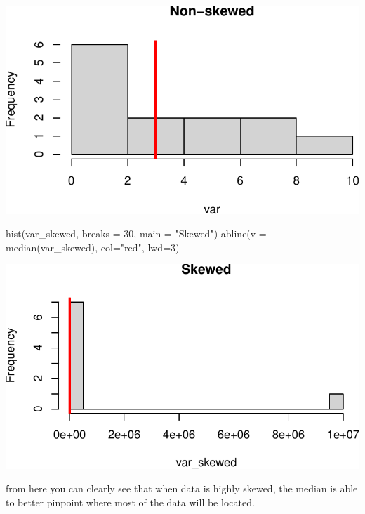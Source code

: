 \documentclass[
  letterpaper,
  DIV=11,
  numbers=noendperiod]{scrartcl}
\newenvironment{Shaded}{\begin{snugshade}}{\end{snugshade}}
\newcommand{\AttributeTok}[1]{\textcolor[rgb]{0.40,0.45,0.13}{#1}}
\newcommand{\DecValTok}[1]{\textcolor[rgb]{0.68,0.00,0.00}{#1}}
\newcommand{\FunctionTok}[1]{\textcolor[rgb]{0.28,0.35,0.67}{#1}}
\newcommand{\NormalTok}[1]{\textcolor[rgb]{0.00,0.23,0.31}{#1}}
\newcommand{\StringTok}[1]{\textcolor[rgb]{0.13,0.47,0.30}{#1}}
\begin{document}
\begin{center}
\includegraphics{stats_review_files/figure-pdf/unnamed-chunk-7-1.pdf}
\end{center}

\begin{Shaded}
\begin{Highlighting}[]
\FunctionTok{hist}\NormalTok{(var\_skewed, }\AttributeTok{breaks =} \DecValTok{30}\NormalTok{, }\AttributeTok{main =} \StringTok{"Skewed"}\NormalTok{)}
\FunctionTok{abline}\NormalTok{(}\AttributeTok{v =} \FunctionTok{median}\NormalTok{(var\_skewed), }\AttributeTok{col=}\StringTok{"red"}\NormalTok{, }\AttributeTok{lwd=}\DecValTok{3}\NormalTok{)}
\end{Highlighting}
\end{Shaded}

\begin{center}
\includegraphics{stats_review_files/figure-pdf/unnamed-chunk-8-1.pdf}
\end{center}

from here you can clearly see that when data is highly skewed, the
median is able to better pinpoint where most of the data will be
located.
\end{document}
